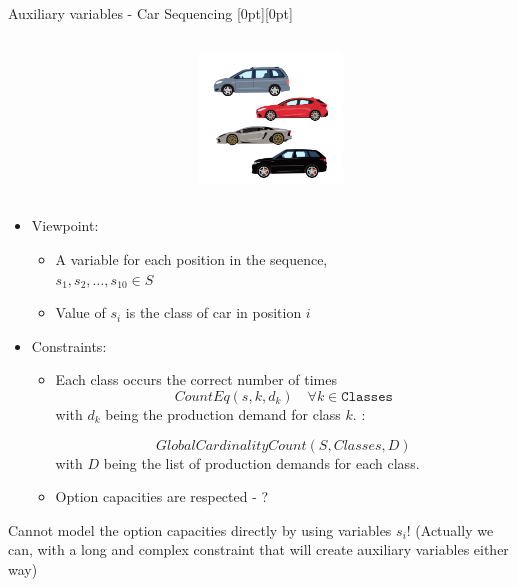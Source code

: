 \documentclass{cons-beamer}
\begin{document}
\begin{frame}{Auxiliary variables - Car Sequencing}
  \raisebox{-\height}[0pt][0pt]{%
    \begin{columns}
      \begin{column}{0.7\textwidth}
          
      \end{column}
      \begin{column}{0.3\textwidth}
        \includegraphics[height=35mm]{images/car_seq.png}%
      \end{column}
    \end{columns}
  }

  \begin{itemize}
    \item Viewpoint:
      \begin{itemize}
        \item A variable for each position in the sequence, \\
        \(s_1, s_2, \ldots, s_{10} \in S\)

        \item Value of \(s_i\) is the class of car in position \(i\)
      \end{itemize}
      \vfill
    
    \item Constraints:
      \begin{itemize}
        \item Each class occurs the correct number of times
        \[ CountEq(s, k, d_k) \quad \forall k \in \mathtt{Classes} \]
        with $d_k$ being the production demand for class $k$.  :

        \[ GlobalCardinalityCount(S, Classes, D) \]
        with $D$ being the list of production demands for each class.
        \vfill

        \item Option capacities are respected - ?
      \end{itemize}
  \end{itemize}    

  \vfill
  \alert{Cannot model the option capacities directly by using variables $s_i$!  (Actually we can, with a long and complex constraint that will create auxiliary variables either way)}
  \vfill
\end{frame}
\end{document}
